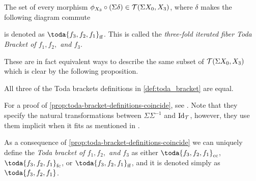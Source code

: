 \begin{definition}
\begin{enumerate}
{            The set of every morphism \( \phi_{X_3} \circ (\Sigma \delta) \in {\mathcal{T}}(\Sigma X_0, X_3) \), where \( \delta \) makes the following diagram commute
            \begin{center}
            \end{center}
            is denoted as \( \toda{f_3, f_2, f_1}_{\ff} \). This is called the \emph{three-fold iterated fiber Toda Bracket of \( f_1, f_2, \) and \( f_3 \)}.
        }
    \end{enumerate}
\end{definition}

These are in fact equivalent ways to describe the same subset of \( {\mathcal{T}}(\Sigma X_0, X_3) \) which is clear by the following proposition.

\begin{proposition}
    \label{prop:toda-bracket-definitions-coincide}
    All three of the Toda brackets definitions in \autoref{def:toda_bracket} are equal.
\end{proposition}

For a proof of \autoref{prop:toda-bracket-definitions-coincide}, see \cite[Proposition 3.3]{Christensen-Frankland_2017}. Note that they specify the natural transformations between \( \Sigma \Sigma^{-1} \) and \( \operatorname{Id}_{{\mathcal{T}}} \), however, they use them implicit when it fits as mentioned in \cite[Section 2, p. 2690]{Christensen-Frankland_2017}.

As a consequence of \autoref{prop:toda-bracket-definitions-coincide} we can uniquely define the \emph{Toda bracket of \( f_1, f_2, \) and \( f_3 \)} as either \( \toda{f_3, f_2, f_1}_{\cc} \), \( \toda{f_3, f_2, f_1}_{\fc} \), or \( \toda{f_3, f_2, f_1}_{\ff} \), and it is denoted simply as \emph{\( \toda{f_3, f_2, f_1} \)}.

